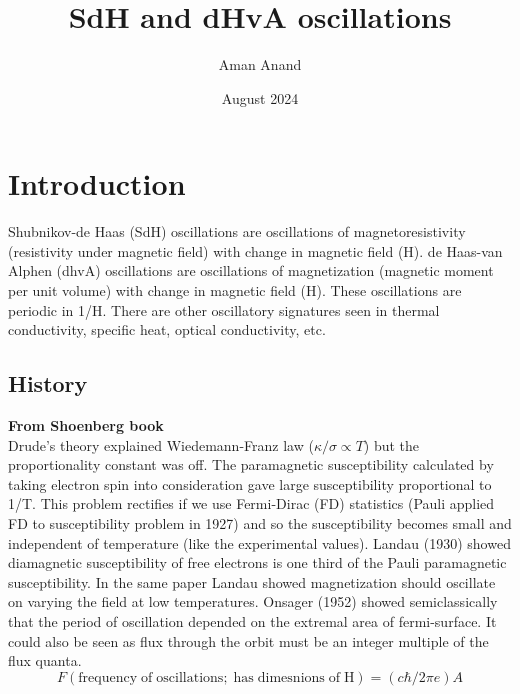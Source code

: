 \documentclass{article}
\title{SdH and dHvA oscillations}
\author{Aman Anand}
\date{August 2024}
\begin{document}
\maketitle

\section{Introduction}
Shubnikov-de Haas (SdH) oscillations are oscillations of magnetoresistivity (resistivity under magnetic field) with change in magnetic field (H). de Haas-van Alphen (dhvA) oscillations are oscillations of magnetization (magnetic moment per unit volume) with change in magnetic field (H). These oscillations are periodic in 1/H. There are other oscillatory signatures seen in thermal conductivity, specific heat, optical conductivity, etc.
\subsection{History}
\textbf{From Shoenberg book}\\
Drude's theory explained Wiedemann-Franz law ($\kappa /\sigma \propto T$) but the proportionality constant was off. The paramagnetic susceptibility calculated by taking electron spin into consideration gave large susceptibility proportional to 1/T. This problem rectifies if we use Fermi-Dirac (FD) statistics (Pauli applied FD to susceptibility problem in 1927) and so the susceptibility becomes small and independent of temperature (like the experimental values). Landau (1930) showed diamagnetic susceptibility of free electrons is one third of the Pauli paramagnetic susceptibility. In the same paper Landau showed magnetization should oscillate on varying the field at low temperatures. Onsager (1952)  showed semiclassically that the period of oscillation depended on the extremal area of fermi-surface. It could also be seen as flux through the orbit must be an integer multiple of the flux quanta. 
\begin{equation}
	F (\mathrm{frequency \; of \; oscillations; \; has \; dimesnions \; of \; H}) = (c\hbar/2\pi e)A
\end{equation}
\end{document}
